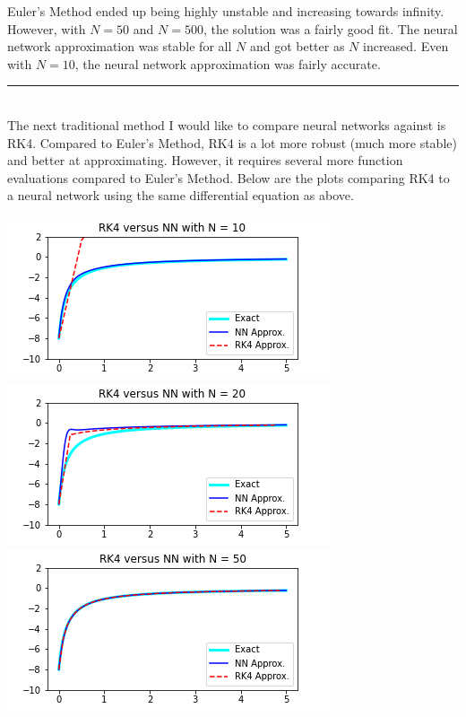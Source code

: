 \documentclass[12pt]{article}
\begin{document}
\begin{description}
    Euler's Method ended up being highly unstable and increasing towards
    infinity. However, with $N = 50$ and $N = 500$, the solution was a fairly
    good fit. The neural network approximation was stable for all $N$ and got
    better as $N$ increased. Even with $N = 10$, the neural network
    approximation was fairly accurate. 
    \hfill \\
    \noindent\rule{15.5cm}{.4pt}
    \hfill \\
    The next traditional method I would like to compare neural networks against
    is RK4. Compared to Euler's Method, RK4 is a lot more robust (much more
    stable) and better at approximating. However, it requires several more
    function evaluations compared to Euler's Method. Below are the plots
    comparing RK4 to a neural network using the same differential equation as
    above. \\
    \begin{minipage}{\linewidth}
        \centering
        \includegraphics[scale=.5]{images/rk10.png}
        \includegraphics[scale=.5]{images/rk20.png}
        \includegraphics[scale=.5]{images/rk50.png}

\end{minipage}
\end{description}
\end{document}
